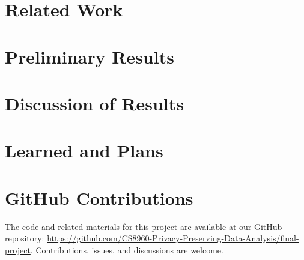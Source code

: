 \documentclass{article}
\begin{document}
    \section{Related Work}\label{sec:related-work}

    \section{Preliminary Results}\label{sec:prelim-results}

 
    \section{Discussion of Results}\label{sec:results-discussion}

    \section{Learned and Plans}\label{sec:learned-and-plans}
    

    
    

    \section*{GitHub Contributions}
    The code and related materials for this project are available at our GitHub repository:
    \url{https://github.com/CS8960-Privacy-Preserving-Data-Analysis/final-project}.
    Contributions, issues, and discussions are welcome.

    \break
\end{document}
